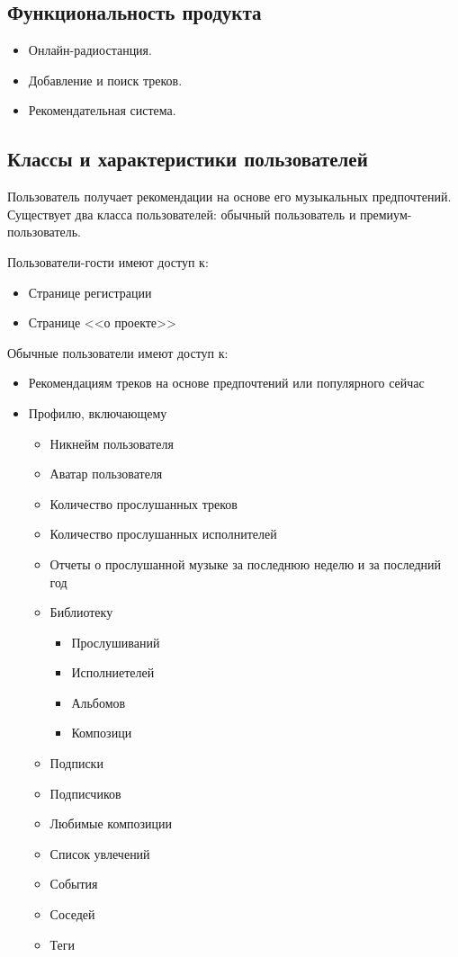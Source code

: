 \subsection{Функциональность продукта}
\begin{itemize}
    \item Онлайн-радиостанция.
    \item Добавление и поиск треков.
    \item Рекомендательная система.
\end{itemize}

\subsection{Классы и характеристики пользователей}
Пользователь получает рекомендации на основе его музыкальных предпочтений.
Существует два класса пользователей: обычный пользователь и премиум-пользователь.

Пользователи-гости имеют доступ к:
\begin{itemize}
    \item Странице регистрации
    \item Странице <<о проекте>>
\end{itemize}

Обычные пользователи имеют доступ к:
\begin{itemize}
    \item Рекомендациям треков на основе предпочтений или популярного сейчас
    \item Профилю, включающему
    \begin{itemize}
        \item Никнейм пользователя
        \item Аватар пользователя
        \item Количество прослушанных треков
        \item Количество прослушанных исполнителей
        \item Отчеты о прослушанной музыке за последнюю неделю и за последний год
        \item Библиотеку
        \begin{itemize}
            \item Прослушиваний
            \item Исполниетелей
            \item Альбомов
            \item Композици
        \end{itemize}
        \item Подписки
        \item Подписчиков
        \item Любимые композиции
        \item Список увлечений
        \item События
        \item Соседей
        \item Теги
    \end{itemize}
\end{itemize}

